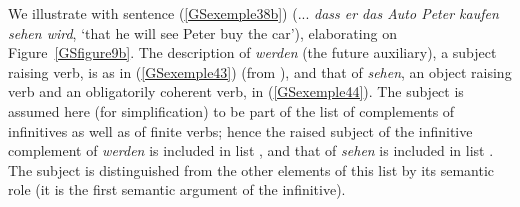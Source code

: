\documentclass[output=paper
                ,modfonts
                ,nonflat
	        ,collection
	        ,collectionchapter
	        ,collectiontoclongg
 	        ,biblatex
                ,babelshorthands
                ,newtxmath
                ,draftmode
                ,colorlinks, citecolor=brown
]{./langsci/langscibook}
\begin{document}
{\begin{exe}
\end{exe}

We illustrate with sentence (\ref{GSexemple38b}) (... \textit{dass er das Auto Peter kaufen sehen wird}, `that he will see Peter buy the car’), elaborating on Figure~\ref{GSfigure9b}. The description of \textit{werden} (the future auxiliary), a subject raising verb, is as in (\ref{GSexemple43}) (from \citealt{muller2018clause}), and that of \textit{sehen}, an object raising verb and an obligatorily coherent verb, in (\ref{GSexemple44}). The subject is assumed here (for simplification) to be part of the list of complements of infinitives as well as of finite verbs; hence the raised subject of the infinitive complement of \textit{werden} is included in list , and that of \textit{sehen} is included in list . The subject is distinguished from the other elements of this list by its semantic role (it is the first semantic argument of the infinitive).     

\begin{exe}
    \label{GSexemple43}
\end{exe}

\begin{exe}
    \label{GSexemple44}
\end{exe}

}
\end{document}
